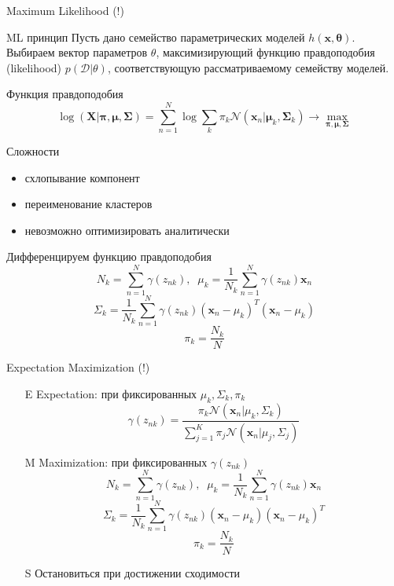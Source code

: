 \documentclass[10pt]{beamer}
\begin{document}
\begin{frame}{Maximum Likelihood (!)}

\begin{block}{ML принцип}
Пусть дано семейство параметрических моделей $h(\mathbf{x}, \mathbf{\theta})$. Выбираем вектор параметров $\theta$, максимизирующий функцию правдоподобия (likelihood) $p(\mathcal{D} | \theta)$, соответствующую рассматриваемому семейству моделей.
\end{block}

\vspace{1em}
Функция правдоподобия
\[
\log(\mathbf{X} | \mathbf{\pi}, \mathbf{\mu}, \mathbf{\Sigma}) = \sum_{n=1}^N \log \sum_k \pi_k \mathcal{N}(\mathbf{x}_n | \mathbf{\mu}_k, \mathbf{\Sigma}_k) \rightarrow \max_{\mathbf{\pi}, \mathbf{\mu}, \mathbf{\Sigma}}
\]

Сложности
\begin{itemize}
\item схлопывание компонент
\item переименование кластеров
\item невозможно оптимизировать аналитически
\end{itemize}

\end{frame}

\begin{frame}{}

Дифференцируем функцию правдоподобия
\[
N_k = \sum_{n=1}^N \gamma(z_{nk}), \;\; \mu_k = \frac 1 {N_k} \sum_{n=1}^N \gamma(z_{nk}) \mathbf{x}_n
\]
\[
\Sigma_k = \frac 1 {N_k} \sum_{n=1}^N \gamma(z_{nk}) (\mathbf{x}_n - \mu_k)^T (\mathbf{x}_n - \mu_k)
\]
\[
\pi_k = \frac{N_k}{N}
\]

\end{frame}

\begin{frame}{Expectation Maximization (!)}

\begin{enumerate}
\item[E] Expectation: при фиксированных $\mu_k, \Sigma_k, \pi_k$
\[
\gamma(z_{nk}) = \frac{\pi_k \mathcal{N} (\mathbf{x}_n | \mu_k, \Sigma_k)}{\sum_{j=1}^K \pi_j \mathcal{N} (\mathbf{x}_n | \mu_j, \Sigma_j)}
\]
\item[M] Maximization: при фиксированных $\gamma(z_{nk})$
\[
N_k = \sum_{n=1}^N \gamma(z_{nk}), \;\; \mu_k = \frac 1 {N_k} \sum_{n=1}^N \gamma(z_{nk}) \mathbf{x}_n
\]
\[
\Sigma_k = \frac 1 {N_k} \sum_{n=1}^N \gamma(z_{nk}) (\mathbf{x}_n - \mu_k)(\mathbf{x}_n - \mu_k)^T
\]
\[
\pi_k = \frac{N_k}{N}
\]
\item[S] Остановиться при достижении сходимости
\end{enumerate}

\end{frame}
\end{document}
